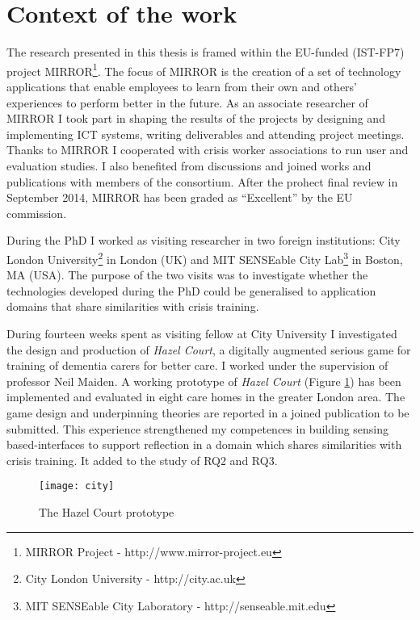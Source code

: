 \section{Context of the work}\label{context-of-the-work}

The research presented in this thesis is framed within the EU-funded (IST-FP7) project MIRROR\footnote{MIRROR Project - http://www.mirror-project.eu}. The focus of MIRROR is the creation of a set of technology applications that enable employees to learn from their own and others' experiences to perform better in the future. As an associate researcher of MIRROR I took part in shaping the results of the projects by designing and implementing ICT systems, writing deliverables and attending project meetings. Thanks to MIRROR I cooperated with crisis worker associations to run user and evaluation studies. I also benefited from discussions and joined works and publications with members of the consortium. After the prohect final review in September 2014, MIRROR has been graded as ``Excellent'' by the EU commission.

During the PhD I worked as visiting researcher in two foreign institutions: City London University\footnote{City London University - http://city.ac.uk} in London (UK) and MIT SENSEable City Lab\footnote{MIT SENSEable City Laboratory - http://senseable.mit.edu} in Boston, MA (USA). The purpose of the two visits was to investigate whether the technologies developed during the PhD could be generalised to application domains that share similarities with crisis training.

During fourteen weeks spent as visiting fellow at City University I investigated the design and production of \emph{Hazel Court}, a digitally augmented serious game for training of dementia carers for better care. I worked under the supervision of professor Neil Maiden. A working prototype of \emph{Hazel Court} (Figure \ref{fig:hazel-court}) has been implemented and evaluated in eight care homes in the greater London area. The game design and underpinning theories are reported in a joined publication to be submitted. This experience strengthened my competences in building sensing based-interfaces to support reflection in a domain which shares similarities with crisis training. It added to the study of RQ2 and RQ3.
\begin{figure}
	[h] \centering 
	\texttt{[image: city]} \caption{The Hazel Court prototype} \label{fig:hazel-court} 
\end{figure}

